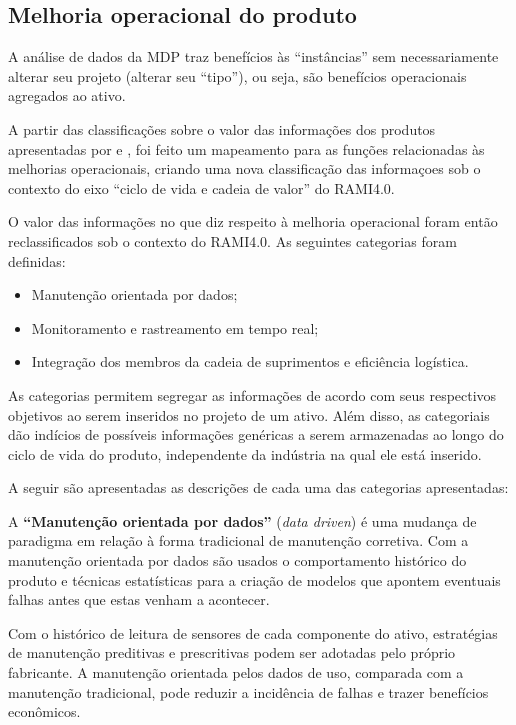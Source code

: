 \subsection{Melhoria operacional do produto}
\label{sec:melhoria-operacional}

A análise de dados da MDP traz benefícios às ``instâncias'' sem necessariamente alterar seu projeto (alterar seu ``tipo''), ou seja, são benefícios operacionais agregados ao ativo.

A partir das classificações sobre o valor das informações dos produtos apresentadas por  e , foi feito um mapeamento para as funções relacionadas às melhorias operacionais, criando uma nova classificação das informaçoes sob o contexto do eixo ``ciclo de vida e cadeia de valor'' do RAMI4.0.

O valor das informações no que diz respeito à melhoria operacional foram então reclassificados sob o contexto do RAMI4.0. As seguintes categorias foram definidas:

\begin{itemize}
	\item Manutenção orientada por dados;
	\item Monitoramento e rastreamento em tempo real;
	\item Integração dos membros da cadeia de suprimentos e eficiência logística.
\end{itemize}

As categorias permitem segregar as informações de acordo com seus respectivos objetivos ao serem inseridos no projeto de um ativo. Além disso, as categoriais dão indícios de possíveis informações genéricas a serem armazenadas ao longo do ciclo de vida do produto, independente da indústria na qual ele está inserido.

A seguir são apresentadas as descrições de cada uma das categorias apresentadas:

A \textbf{``Manutenção orientada por dados''} (\textit{data driven}) é uma mudança de paradigma em relação à forma tradicional de manutenção corretiva. Com a manutenção orientada por dados são usados o comportamento histórico do produto e técnicas estatísticas para a criação de modelos que apontem eventuais falhas antes que estas venham a acontecer.

Com o histórico de leitura de sensores de cada componente do ativo, estratégias de manutenção preditivas e prescritivas podem ser adotadas pelo próprio fabricante. A manutenção orientada pelos dados de uso, comparada com a manutenção tradicional, pode reduzir a incidência de falhas e trazer benefícios econômicos. %

